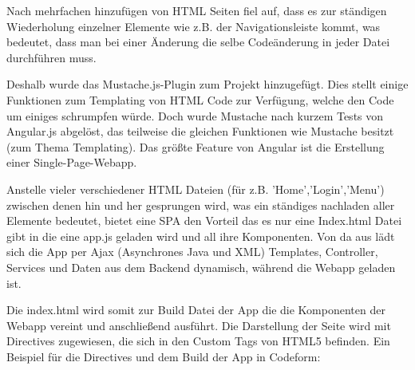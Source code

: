 \documentclass[11pt,a4paper]{article} %
\begin{document}
Nach mehrfachen hinzufügen von HTML Seiten fiel auf, dass es zur ständigen Wiederholung einzelner Elemente wie z.B. der Navigationsleiste kommt, was bedeutet, dass man bei einer Änderung die selbe Codeänderung in jeder Datei durchführen muss. 
\par
Deshalb wurde das Mustache.js-Plugin zum Projekt hinzugefügt. Dies stellt einige Funktionen zum Templating von HTML Code zur Verfügung, welche den Code um einiges schrumpfen würde. Doch wurde Mustache nach kurzem Tests von Angular.js abgelöst, das teilweise die gleichen Funktionen wie Mustache besitzt (zum Thema Templating). Das größte Feature von Angular ist die Erstellung einer Single-Page-Webapp. 
\par
Anstelle vieler verschiedener HTML Dateien (für z.B. 'Home','Login','Menu') zwischen denen hin und her gesprungen wird, was ein ständiges nachladen aller Elemente bedeutet, bietet eine SPA den Vorteil das es nur eine Index.html Datei gibt in die eine app.js geladen wird und all ihre Komponenten. Von da aus lädt sich die App per Ajax (Asynchrones Java und XML) Templates, Controller, Services und Daten aus dem Backend dynamisch, während die Webapp geladen ist.
\par
Die index.html wird somit zur Build Datei der App die die Komponenten der Webapp vereint und anschließend ausführt. Die Darstellung der Seite wird mit Directives zugewiesen, die sich in den Custom Tags von HTML5 befinden. Ein Beispiel für die Directives und dem Build der App in Codeform:
\end{document}
